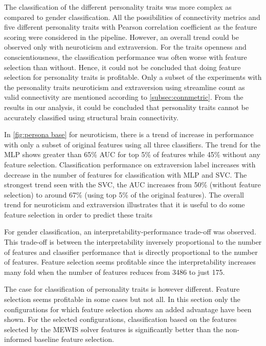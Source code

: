 \documentclass[msthesis.tex]{subfiles}
\begin{document}
The classification of the different personality traits was more complex as compared to gender classification. All the possibilities of connectivity metrics and five different personality traits with Pearson correlation coefficient as the feature scoring were considered in the pipeline. However, an overall trend could be observed only with neuroticism and extraversion. For the traits openness and 
conscientiousness, the classification performance was often worse with feature selection than without. Hence, it could not be concluded that doing feature selection for personality traits is profitable. Only a subset of the experiments with the personality traits neuroticism and extraversion using streamline count as valid connectivity are mentioned according to \autoref{subsec:connmetric}. From the results in our analysis, it could be concluded that personality traits cannot be accurately classified using structural brain connectivity.

In \cref{fig:persona base} for neuroticism, there is a trend of increase in performance with only a subset of original features using all three classifiers. The trend for the \gls{MLP} shows greater than 65\% \gls{AUC} for top 5\% of features while 45\% without any feature selection. Classification performance on extraversion label increases with decrease in the number of features for classification with \gls{MLP} and \gls{SVC}. The strongest trend seen with the SVC, the \gls{AUC} increases from 50\% (without feature selection) to around 67\% (using top 5\% of the original features). The overall trend for neuroticism and extraversion illustrates that it is useful to do some feature selection in order to predict these traits

For gender classification, an interpretability-performance trade-off was observed. This trade-off is between the interpretability inversely proportional to the number of features and classifier performance that is directly proportional to the number of features. Feature selection seems profitable since the interpretability increases many fold when the number of features reduces from 3486 to just 175. 

The case for classification of personality traits is however different. Feature selection seems profitable in some cases but not all. In this section only the configurations for which feature selection shows an added advantage have been shown. For the selected configurations, classification based on the features selected by the \gls{MEWIS} solver features is significantly better than the non-informed baseline feature selection.
\end{document}
